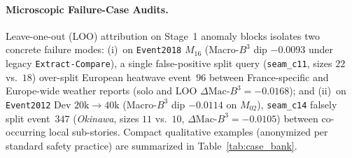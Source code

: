 \paragraph{Microscopic Failure-Case Audits.}
Leave-one-out (LOO) attribution on Stage~1 anomaly blocks isolates two concrete failure modes: (i)~on \texttt{Event2018} $M_{16}$ (Macro-$B^3$ dip $-0.0093$ under legacy \texttt{Extract-Compare}), a single false-positive split query (\texttt{seam\_c11}, sizes $22$ vs.\ $18$) over-split European heatwave event~$96$ between France-specific and Europe-wide weather reports (solo and LOO $\Delta\text{Mac-}B^3 = -0.0168$); and (ii)~on \texttt{Event2012} Dev $20\text{k}\to 40\text{k}$ (Macro-$B^3$ dip $-0.0114$ on $M_{02}$), \texttt{seam\_c14} falsely split event~$347$ (\emph{Okinawa}, sizes $11$ vs.\ $10$, $\Delta\text{Mac-}B^3 = -0.0105$) between co-occurring local sub-stories. Compact qualitative examples (anonymized per standard safety practice) are summarized in Table~\ref{tab:case_bank}.

\begin{table}[t]
\centering
\caption{Qualitative anonymized query audit from Stage~1 D6 (showing structural leverage of TP vs.\ sub-topic FP boundary cases).}
\label{tab:case_bank}
\end{table}
